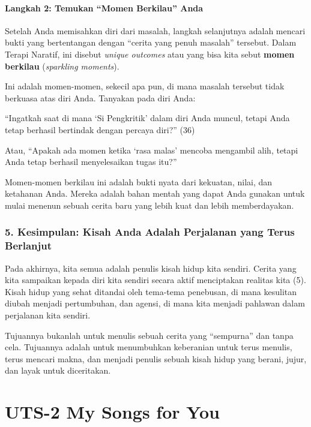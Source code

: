\documentclass[
  letterpaper,
  DIV=11,
  numbers=noendperiod]{scrreprt}
\begin{document}
\subsubsection{Langkah 2: Temukan ``Momen Berkilau''
Anda}\label{langkah-2-temukan-momen-berkilau-anda}

Setelah Anda memisahkan diri dari masalah, langkah selanjutnya adalah
mencari bukti yang bertentangan dengan ``cerita yang penuh masalah''
tersebut. Dalam Terapi Naratif, ini disebut \emph{unique outcomes} atau
yang bisa kita sebut \textbf{momen berkilau} (\emph{sparkling moments}).

Ini adalah momen-momen, sekecil apa pun, di mana masalah tersebut tidak
berkuasa atas diri Anda. Tanyakan pada diri Anda:

``Ingatkah saat di mana `Si Pengkritik' dalam diri Anda muncul, tetapi
Anda tetap berhasil bertindak dengan percaya diri?'' (36)

Atau, ``Apakah ada momen ketika `rasa malas' mencoba mengambil alih,
tetapi Anda tetap berhasil menyelesaikan tugas itu?''

Momen-momen berkilau ini adalah bukti nyata dari kekuatan, nilai, dan
ketahanan Anda. Mereka adalah bahan mentah yang dapat Anda gunakan untuk
mulai menenun sebuah cerita baru yang lebih kuat dan lebih
memberdayakan.

\subsection{\texorpdfstring{\textbf{5. Kesimpulan: Kisah Anda Adalah
Perjalanan yang Terus
Berlanjut}}{5. Kesimpulan: Kisah Anda Adalah Perjalanan yang Terus Berlanjut}}\label{kesimpulan-kisah-anda-adalah-perjalanan-yang-terus-berlanjut}

Pada akhirnya, kita semua adalah penulis kisah hidup kita sendiri.
Cerita yang kita sampaikan kepada diri kita sendiri secara aktif
menciptakan realitas kita (5). Kisah hidup yang sehat ditandai oleh
tema-tema penebusan, di mana kesulitan diubah menjadi pertumbuhan, dan
agensi, di mana kita menjadi pahlawan dalam perjalanan kita sendiri.

Tujuannya bukanlah untuk menulis sebuah cerita yang ``sempurna'' dan
tanpa cela. Tujuannya adalah untuk menumbuhkan keberanian untuk terus
menulis, terus mencari makna, dan menjadi penulis sebuah kisah hidup
yang berani, jujur, dan layak untuk diceritakan.


\chapter{UTS-2 My Songs for You}\label{uts-2-my-songs-for-you}
\end{document}
